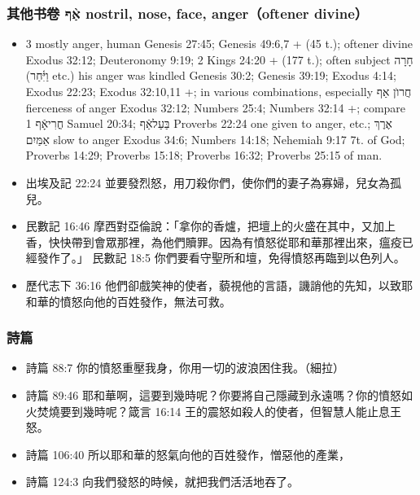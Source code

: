 \subsubsection{其他书卷 אַ֨ף  nostril, nose, face, anger（oftener divine）}
\begin{itemize} 
\itemsep-.25em
\item 3 mostly anger, human Genesis 27:45; Genesis 49:6,7 + (45 t.); oftener divine Exodus 32:12; Deuteronomy 9:19; 2 Kings 24:20 + (177 t.); often subject חָרָה (וַיִּ֫חַר etc.) his anger was kindled Genesis 30:2; Genesis 39:19; Exodus 4:14; Exodus 22:23; Exodus 32:10,11 +; in various combinations, especially חֲרוֺן אַף fierceness of anger Exodus 32:12; Numbers 25:4; Numbers 32:14 +; compare חֳרִיאָֿף 1 Samuel 20:34; בַּעַלאַֿף Proverbs 22:24 one given to anger, etc.; אֶרֶךְ אַמַּיִם slow to anger Exodus 34:6; Numbers 14:18; Nehemiah 9:17 7t. of God; Proverbs 14:29; Proverbs 15:18; Proverbs 16:32; Proverbs 25:15 of man.
\item 出埃及記 22:24 並要發烈怒，用刀殺你們，使你們的妻子為寡婦，兒女為孤兒。
\item 民數記 16:46 摩西對亞倫說：「拿你的香爐，把壇上的火盛在其中，又加上香，快快帶到會眾那裡，為他們贖罪。因為有憤怒從耶和華那裡出來，瘟疫已經發作了。」
民數記 18:5 你們要看守聖所和壇，免得憤怒再臨到以色列人。
\item 歷代志下 36:16 他們卻戲笑神的使者，藐視他的言語，譏誚他的先知，以致耶和華的憤怒向他的百姓發作，無法可救。
\end{itemize}  

\subsubsection{詩篇}
\begin{itemize} 
\itemsep-.25em
\item 詩篇 88:7 你的憤怒重壓我身，你用一切的波浪困住我。（細拉）
\item 詩篇 89:46 耶和華啊，這要到幾時呢？你要將自己隱藏到永遠嗎？你的憤怒如火焚燒要到幾時呢？箴言 16:14 王的震怒如殺人的使者，但智慧人能止息王怒。
\item 詩篇 106:40 所以耶和華的怒氣向他的百姓發作，憎惡他的產業，
\item 詩篇 124:3 向我們發怒的時候，就把我們活活地吞了。
\end{itemize}  

